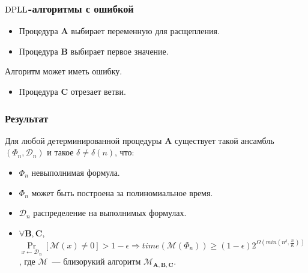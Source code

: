 \begin{frame}
	\frametitle{$\mathrm{DPLL}$-алгоритмы с ошибкой}

   	
    
	\pause
    \pause
    \pause
    \pause
    \pause
    \begin{itemize}
        \item Процедура $\mathbf{A}$ выбирает переменную для расщепления.
    	\pause
	    \item Процедура $\mathbf{B}$ выбирает первое значение.
    \end{itemize}

    \pause
    Алгоритм может иметь ошибку.

    \pause
    \pause
    \begin{itemize}
	    \item Процедура $\mathbf{C}$ отрезает ветви.
    \end{itemize}
\end{frame}


\begin{frame}
	\frametitle{Результат}
	\pause
	\begin{theorem}
        Для любой детерминированной процедуры $\mathbf{A}$ существует такой ансамбль $(\Phi_n, \mathcal{D}_n)$ и такое $\delta \ne
        \delta(n)$, что:
        \pause
		\begin{itemize}
            \item $\Phi_n$ невыполнимая формула.
        	\item $\Phi_n$ может быть построена за полиномиальное время.
            \pause
            \item $\mathcal{D}_n$ распределение на выполнимых формулах.
            \pause
			\item $\forall \mathbf{B}, \mathbf{C}$,
				$\Pr\limits_{x \gets \mathcal{D}_n}[\mathcal{M}(x)
                \ne 0] > 1 - \epsilon \Rightarrow
                time(\mathcal{M}(\Phi_n)) \ge (1 - \epsilon) 2^{\Omega(min(n^\delta, \frac{n}{K}))}$, где $\mathcal{M}$~---
                близорукий алгоритм $\mathcal{M}_{\mathbf{A}, \mathbf{B},\mathbf{C}}$.
		\end{itemize}
	\end{theorem}
\end{frame}


